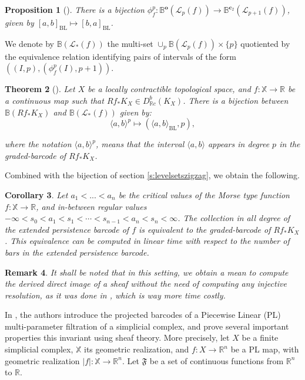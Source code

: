 \documentclass[11pt]{article}
\newtheorem{theorem}{Theorem}[section]
\newtheorem{proposition}[theorem]{Proposition}
\newtheorem{remark}[theorem]{Remark}
\newtheorem{corollary}[theorem]{Corollary}
\theoremstyle{remark}
\newcommand{\R}{\mathbb{R}}
\newcommand{\X}{\mathbb{X}}
\begin{document}
\begin{proposition}[\cite{BGO19}]
There is a bijection  $\phi_f^p : \mathbb{B}^\textbf{o}(\mathcal{L}_p(f)) \longrightarrow \mathbb{B}^{\textbf{c}_2}(\mathcal{L}_{p+1}(f))$, given by $[a,b]_{\mathrm{BL}} \mapsto [b,a]_{\mathrm{BL}}$.
\end{proposition}

We denote by $\mathbb{B}(\mathcal{L}_\ast(f))$ the multi-set $\cup_p \mathbb{B}(\mathcal{L}_p(f)) \times \{p\}$ quotiented by the equivalence relation identifying pairs of intervals of the form $((I,p), (\phi_f^p(I), p+1))$.  

\begin{theorem}[\cite{BGO19}]
Let $X$ be a locally contractible topological space, and $f : \mathbb{X} \longrightarrow \R$ be a continuous map such that $R f_\ast K_X \in D^b_{\mathbb{R} c}(K_X)$. There is a bijection between $\mathbb{B}(R f_\ast K_X)$ and $\mathbb{B}(\mathcal{L}_\ast(f))$ given by: \[\langle a,b \rangle^p \mapsto (\langle a,b \rangle_{\mathrm{BL}},p),\]

where the notation $\langle a,b\rangle^p$, means that the interval $\langle a,b\rangle$ appears in degree $p$ in the graded-barcode of  $R f_\ast K_X$.

\end{theorem}

Combined with the bijection of section \ref{s:levelsetszigzag}, we obtain the following.

\begin{corollary}
Let $a_1<...<a_n$ be the critical values of the Morse type function $f:\X\rightarrow\R$, and in-between regular values $-\infty<s_0<a_1<s_1<\cdots<s_{n-1}<a_n<s_n<\infty$. The collection in all degree of the extended persistence barcode of $f$ is equivalent to the graded-barcode of $R f_\ast K_X$. This equivalence can be computed in linear time with respect to the number of bars in the extended persistence barcode.
\end{corollary}

\begin{remark}
It shall be noted that in this setting, we obtain a mean to compute the derived direct image of a sheaf without the need of computing any injective resolution, as it was done in \cite{Brown21}, which is way more time costly.
\end{remark}

In \cite{BP22}, the authors introduce the projected barcodes of a Piecewise Linear (PL) multi-parameter filtration of a simplicial complex, and prove several important properties this invariant using sheaf theory. More precisely, let $X$ be a finite simplicial complex, $\mathbb{X}$ its geometric realization, and $f : X \to \mathbb{R}^n$ be a PL map, with geometric realization $|f| : \mathbb{X} \to \R^n$. Let $\mathfrak{F}$ be a set of continuous functions from $\R^n$ to $\R$.
\end{document}
